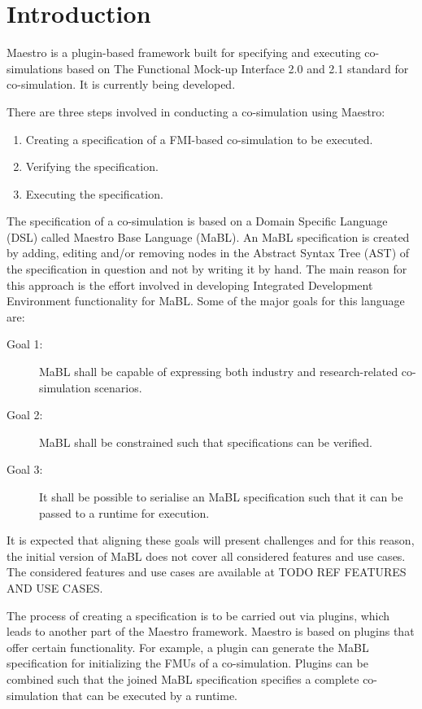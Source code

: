 \section{Introduction}\label{sec:intro}
Maestro is a plugin-based framework built for specifying and executing co-simulations based
on The Functional Mock-up Interface 2.0 and 2.1 standard for co-simulation. It
is currently being developed.

There are three steps involved in conducting a co-simulation using Maestro:
\begin{enumerate}
  \item Creating a specification of a FMI-based co-simulation to be executed.
  \item Verifying the specification.
  \item Executing the specification.
\end{enumerate}

The specification of a co-simulation is based on a Domain Specific Language (DSL) called Maestro
Base Language (MaBL). An MaBL specification is created by adding, editing and/or
removing nodes in the Abstract Syntax Tree (AST) of the specification in question and not by
writing it by hand. The main
reason for this approach is the effort involved in developing Integrated Development
Environment functionality for MaBL. Some of the major goals for this language are:
\begin{description}
  \item[Goal 1:] MaBL shall be capable of expressing both industry and
    research-related co-simulation scenarios.
  \item[Goal 2:] MaBL shall be constrained such that specifications can be
    verified.
    \item[Goal 3:] It shall be possible to serialise an MaBL specification such
    that it can be passed to a runtime for execution.
\end{description}
It is expected that aligning these goals will present challenges and for this
reason, the initial version of MaBL does not cover all considered features and
use cases. The considered features and use cases are available at TODO REF
FEATURES AND USE CASES.

The process of creating a specification is to be carried out via plugins, which
leads to another part of the Maestro framework. Maestro is based on plugins that
offer certain functionality. For example, a plugin can generate the MaBL
specification for initializing the FMUs of a co-simulation. Plugins can be
combined such that the joined MaBL specification specifies a complete
co-simulation that can be executed by a runtime.

